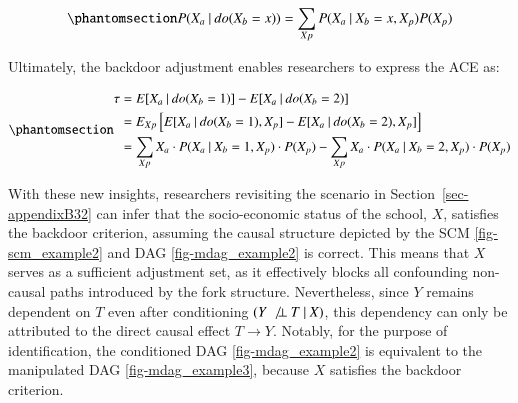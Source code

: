 \documentclass[
  authoryear,
  review,
  1p]{elsarticle}
\begin{document}
\begin{equation}\phantomsection\label{eq-backdoor}{
P(X_{a} \:|\:do(X_{b}=x)) = \sum_{Xp} P(X_{a} \:|\:X_{b}=x, X_{p}) P(X_{p})
}\end{equation}

Ultimately, the backdoor adjustment enables researchers to express the
ACE as:

\begin{equation}\phantomsection\label{eq-backdoor_adjustment}{
\begin{aligned}
\tau & = E[X_{a} \:|\:do(X_{b}=1)]- E[X_{a} \:|\:do(X_{b}=2)] \\
  & = E_{Xp}\left[ E[X_{a} \:|\:do(X_{b}=1), X_{p}]- E[X_{a} \:|\:do(X_{b}=2), X_{p}] \right] \\
  & = \sum_{Xp} X_{a} \cdot P(X_{a} \:|\:X_{b}=1, X_{p}) \cdot P(X_{p}) - \sum_{Xp} X_{a} \cdot P(X_{a} \:|\:X_{b}=2, X_{p}) \cdot P(X_{p})
\end{aligned}
}\end{equation}

With these new insights, researchers revisiting the scenario in
Section~\ref{sec-appendixB32} can infer that the socio-economic status
of the school, \(X\), satisfies the backdoor criterion, assuming the
causal structure depicted by the SCM \ref{fig-scm_example2} and DAG
\ref{fig-mdag_example2} is correct. This means that \(X\) serves as a
sufficient adjustment set, as it effectively blocks all confounding
non-causal paths introduced by the fork structure. Nevertheless, since
\(Y\) remains dependent on \(T\) even after conditioning
\((Y \:\not\bot\:T \:|\:X)\), this dependency can only be attributed to
the direct causal effect \(T \rightarrow Y\). Notably, for the purpose
of identification, the conditioned DAG \ref{fig-mdag_example2} is
equivalent to the manipulated DAG \ref{fig-mdag_example3}, because \(X\)
satisfies the backdoor criterion.
\end{document}
